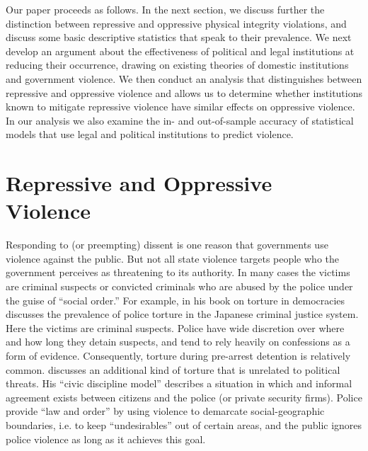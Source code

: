 \documentclass[12pt]{article}
\begin{document}
Our paper proceeds as follows. In the next section, we discuss further the distinction between repressive and oppressive physical integrity violations, and discuss some basic descriptive statistics that speak to their prevalence. We next develop an argument about the effectiveness of political and legal institutions at reducing their occurrence, drawing on existing theories of domestic institutions and government violence. We then conduct an analysis that distinguishes between repressive and oppressive violence and allows us to determine whether institutions known to mitigate repressive violence have similar effects on oppressive violence. In our analysis we also examine the in- and out-of-sample accuracy of statistical models that use legal and political institutions to predict violence.    

\section*{Repressive and Oppressive Violence} 

Responding to (or preempting) dissent is one reason that governments use violence against the public. But not all state violence targets people who the government perceives as threatening to its authority. In many cases the victims are criminal suspects or convicted criminals who are abused by the police under the guise of ``social order.''  For example, in his book on torture in democracies \citep{Rejali2007} discusses the prevalence of police torture in the Japanese criminal justice system. Here the victims are criminal suspects. Police have wide discretion over where and how long they detain suspects, and tend to rely heavily on confessions as a form of evidence. Consequently, torture during pre-arrest detention is relatively common. \citep{Rejali2007} discusses an additional kind of torture that is unrelated to political threats. His ``civic discipline model'' describes a situation in which and informal agreement exists between citizens and the police (or private security firms). Police provide ``law and order'' by using violence to demarcate social-geographic boundaries, i.e. to keep ``undesirables'' out of certain areas, and the public ignores police violence as long as it achieves this goal. 
\end{document}
